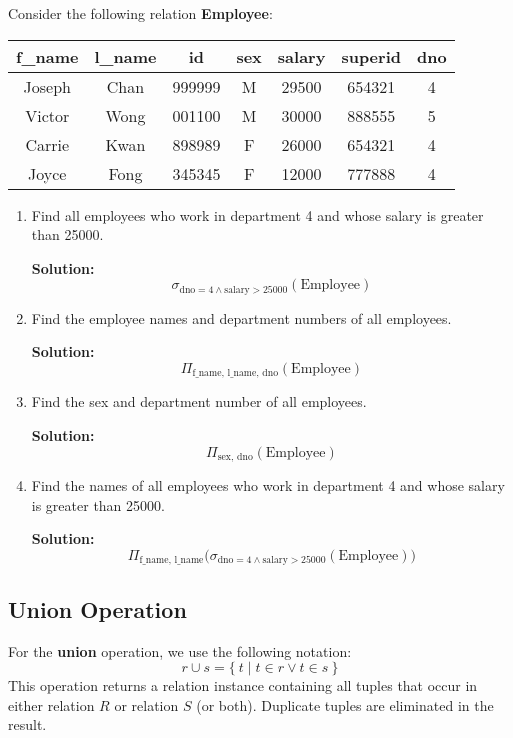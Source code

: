 \begin{eg}
Consider the following relation \textbf{Employee}:

\begin{table}[H]
\centering
\begin{tabular}{c|c|c|c|c|c|c}
    \toprule
    f\_name & l\_name & id & sex & salary & superid & dno  \\
    \midrule
    Joseph & Chan & 999999 & M & 29500 & 654321 & 4  \\
    Victor & Wong & 001100 & M & 30000 & 888555 & 5  \\
    Carrie & Kwan & 898989 & F & 26000 & 654321 & 4  \\
    Joyce & Fong & 345345 & F & 12000 & 777888 & 4  \\
    \bottomrule
\end{tabular}
\end{table}

\begin{enumerate}
  \item Find all employees who work in department 4 and whose salary is greater than 25000. 

  \textbf{Solution:} 
  \[
    \sigma_{\text{dno} = 4 \land \text{salary} > 25000} (\text{Employee})
  \]

  \item Find the employee names and department numbers of all employees. 

  \textbf{Solution:} 
  \[
    \Pi_{\text{f\_name, l\_name, dno}} (\text{Employee})
  \]

  \item Find the sex and department number of all employees. 

  \textbf{Solution:} 
  \[
    \Pi_{\text{sex, dno}} (\text{Employee})
  \]

  \item Find the names of all employees who work in department 4 and whose salary is greater than 25000. 

  \textbf{Solution:} 
  \[
    \Pi_{\text{f\_name, l\_name}} \big( \sigma_{\text{dno} = 4 \land \text{salary} > 25000} (\text{Employee}) \big)
  \]
\end{enumerate}
\end{eg}

\subsection{Union Operation}
For the \textbf{union} operation, we use the following notation: 
\[
  r \cup s = \{\ t \mid t \in r \lor t \in s \ \}
\]
This operation returns a relation instance containing all tuples that occur in either relation \(R\) or relation \(S\) (or both). Duplicate tuples are eliminated in the result. 

